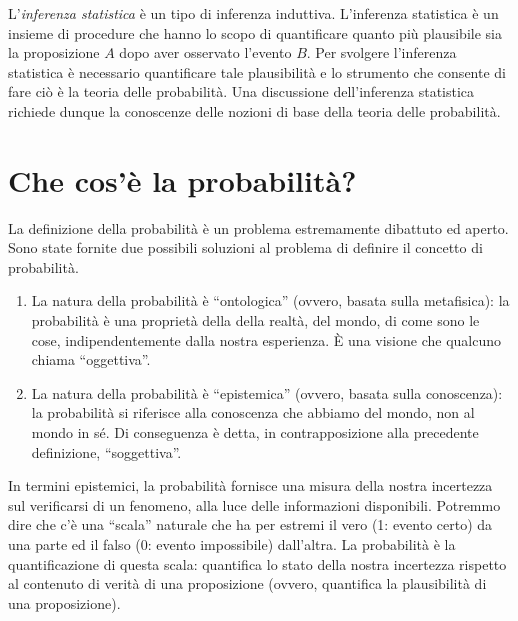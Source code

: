 \documentclass[
  11pt,
]{krantz}
\theoremstyle{definition}
\theoremstyle{definition}
\theoremstyle{definition}
\theoremstyle{definition}
\theoremstyle{remark}
\begin{document}
L'\emph{inferenza statistica} è un tipo di inferenza induttiva. L'inferenza statistica è un insieme di procedure che hanno lo scopo di quantificare quanto più plausibile sia la proposizione \(A\) dopo aver osservato l'evento \(B\). Per svolgere l'inferenza statistica è necessario quantificare tale plausibilità e lo strumento che consente di fare ciò è la teoria delle probabilità. Una discussione dell'inferenza statistica richiede dunque la conoscenze delle nozioni di base della teoria delle probabilità.

\hypertarget{che-cosuxe8-la-probabilituxe0}{%
\section{Che cos'è la probabilità?}\label{che-cosuxe8-la-probabilituxe0}}

La definizione della probabilità è un problema estremamente dibattuto ed aperto. Sono state fornite due possibili soluzioni al problema di definire il concetto di probabilità.

\begin{enumerate}
\def\labelenumi{(\alph{enumi})}
\item
  La natura della probabilità è ``ontologica'' (ovvero, basata sulla metafisica): la probabilità è una proprietà della della realtà, del mondo, di come sono le cose, indipendentemente dalla nostra esperienza. È una visione che qualcuno chiama ``oggettiva''.
\item
  La natura della probabilità è ``epistemica'' (ovvero, basata sulla conoscenza): la probabilità si riferisce alla conoscenza che abbiamo del mondo, non al mondo in sé. Di conseguenza è detta, in contrapposizione alla precedente definizione, ``soggettiva''.
\end{enumerate}

In termini epistemici, la probabilità fornisce una misura della nostra incertezza sul verificarsi di un fenomeno, alla luce delle informazioni disponibili. Potremmo dire che c'è una ``scala'' naturale che ha per estremi il vero (1: evento certo) da una parte ed il falso (0: evento impossibile) dall'altra. La probabilità è la quantificazione di questa scala: quantifica lo stato della nostra incertezza rispetto al contenuto di verità di una proposizione (ovvero, quantifica la plausibilità di una proposizione).
\end{document}
